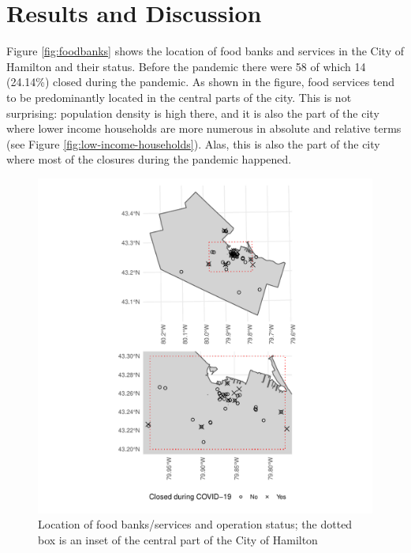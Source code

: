 \documentclass[]{elsarticle} %
\begin{document}
\hypertarget{results-and-discussion}{%
\section{Results and Discussion}\label{results-and-discussion}}

Figure \ref{fig:foodbanks} shows the location of food banks and services
in the City of Hamilton and their status. Before the pandemic there were
58 of which 14 (24.14\%) closed during the pandemic. As shown in the
figure, food services tend to be predominantly located in the central
parts of the city. This is not surprising: population density is high
there, and it is also the part of the city where lower income households
are more numerous in absolute and relative terms (see Figure
\ref{fig:low-income-households}). Alas, this is also the part of the
city where most of the closures during the pandemic happened.

\begin{figure}
\includegraphics[width=1\linewidth]{Accessibility-Foodbanks-Hamilton_files/figure-latex/plot-location-foodbanks-1} \caption{\label{fig:foodbanks}Location of food banks/services and operation status; the dotted box is an inset of the central part of the City of Hamilton}\label{fig:plot-location-foodbanks}
\end{figure}
\end{document}
